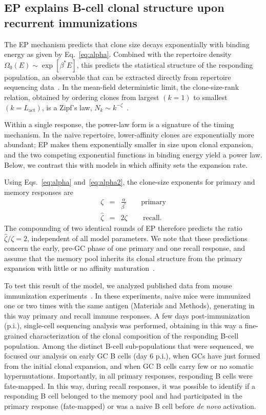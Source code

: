 \documentclass[aps, pre, twocolumn, 10pt, groupedaddress, superscriptaddress, linenumbers]{revtex4-2}
\newcommand{\EQA}{\begin{eqnarray}}
\newcommand{\EEA}{\end{eqnarray}}
\newcommand{\act}{\text{act}}
\newcommand{\DG}{E}
\begin{document}
\subsection*{EP explains B-cell clonal structure upon recurrent immunizations}
The EP mechanism predicts that clone size decays exponentially with binding energy as given by Eq.~\ref{eq:alpha}.
Combined with the repertoire density $\Omega_0(\DG) \sim \exp[{\beta^*\DG}]$, this predicts the statistical structure of the responding population, an observable that can be extracted directly from repertoire sequencing data~\cite{MoranTovar_2024_Primary}.
In the mean-field deterministic limit, the clone-size-rank relation, obtained by ordering clones from largest $(k=1)$ to smallest $(k = L_\act)$, is a Zipf's law, $N_k \sim k^{-\zeta}$~\cite{MoranTovar_2024_Primary}.

Within a single response, the power-law form is a signature of the timing mechanism.
In the naive repertoire, lower-affinity clones are exponentially more abundant; EP makes them exponentially smaller in size upon clonal expansion, and the two competing exponential functions in binding energy yield a power law.
Below, we contrast this with models in which affinity sets the expansion rate.

Using Eqs.~\ref{eq:alpha} and~\ref{eq:alpha2}, the clone-size exponents for primary and memory responses are
\EQA
\zeta &=& \frac{\alpha}{\beta^*} \qquad \text{primary}\nonumber \\
\hat\zeta &=& 2\zeta \,\qquad \text{recall}.
\label{eq:zetas}
\EEA
The compounding of two identical rounds of EP therefore predicts the ratio $\hat\zeta/\zeta = 2$, independent of all model parameters.
We note that these predictions concern the early, pre-GC phase of one primary and one recall response, and assume that the memory pool inherits its clonal structure from the primary expansion with little or no affinity maturation~\cite{tangye_human_2007, dogan_multiple_2009, Viant_2020_Fate, Mesin_2020_Restricted_clonality, Glaros_2021_Early_memory}.

To test this result of the model, we analyzed published data from mouse immunization experiments~\cite{Mesin_2020_Restricted_clonality}.
In these experiments, naive mice were immunized one or two times with the same antigen (Materials and Methods), generating in this way primary and recall immune responses.
A few days post-immunization (p.i.), single-cell sequencing analysis was performed, obtaining in this way a fine-grained characterization of the clonal composition of the responding B-cell population.
Among the distinct B-cell sub-populations that were sequenced, we focused our analysis on early GC B cells (day 6 p.i.), when GCs have just formed from the initial clonal expansion, and when GC B cells carry few or no somatic hypermutations.
Importantly, in all primary responses, responding B cells were fate-mapped.
In this way, during recall responses, it was possible to identify if a responding B cell belonged to the memory pool and had participated in the primary response (fate-mapped) or was a naive B cell before \textit{de novo} activation.
\end{document}

